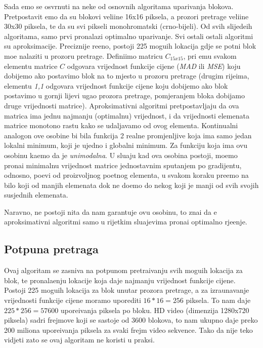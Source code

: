 Sada \cj emo se osvrnuti na neke od osnovnih algoritama uparivanja blokova. Pretpostavit \cj emo da su blokovi veli\ch ine 16x16 piksela, a prozori pretrage veli\ch ine 30x30 piksela, te da su svi pikseli monohromatski
(crno-bijeli). Od svih slijede\cj ih algoritama, samo prvi pronalazi optimalno uparivanje. Svi ostali ostali algoritmi su aproksimacije. Preciznije re\ch eno, postoji 225 mogu\cj ih lokacija gdje se po\ch tni blok mo\zh e nalaziti
u prozoru pretrage. Defini\sh imo matricu $C_{15x15}$, pri \ch emu svakom elementu matrice $C$ odgovara vrijednost funkcije cijene (\textit{MAD} ili \textit{MSE}) koju dobijemo ako postavimo blok na to mjesto u prozoru pretrage
(drugim rije\ch ima, elementu \textit{1,1} odgovara vrijednost funkcije cijene koju dobijemo ako blok postavimo u gornji lijevi ugao prozora pretrage, pomjeranjem bloka dobijamo druge vrijednosti matrice).
Aproksimativni algoritmi pretpostavljaju da ova matrica ima jednu najmanju (optimalnu) vrijednost, i da vrijednosti elemenata matrice monotono rastu kako se udaljavamo od ovog elementa. Kontinualni analogon ove osobine
bi bila funkcija 2 realne promjenljive koja ima samo jedan lokalni minimum, koji je ujedno i globalni minimum. Za funkciju koja ima ovu osobinu ka\zh emo da je \textit{unimodalna}. U slu\ch aju kad ova osobina postoji,
mo\zh emo prona\cj i minimalnu vrijednost matrice jednostavnim spu\sh tanjem po gradijentu, odnosno, po\ch ev\sh i od proizvoljnog po\ch etnog elementa, u svakom koraku pre\dj emo na bilo koji od manjih elemenata dok ne
do\dj emo do nekog koji je manji od svih svojih susjednih elemenata.

Naravno, ne postoji ni\sh ta da nam garantuje ovu osobinu, \sh to zna\ch i da \cj e aproksimativni algoritmi samo u rijetkim slu\ch ajevima prona\cj i optimalno rje\sh enje.

\subsection{Potpuna pretraga}
Ovaj algoritam se zasniva na potpunom pretra\zh ivanju svih mogu\cj ih lokacija za blok, te pronala\zh enju lokacije koja daje najmanju vrijednost funkcije cijene. Postoji 225 mogu\cj ih lokacija za blok unutar prozora pretrage,
a za izra\ch unavanje vrijednosti funkcije cijene moramo uporediti $16 * 16 = 256$ piksela. To nam daje $225 * 256 = 57600$ upore\dj ivanja piksela po bloku. HD video (dimenzija 1280x720 piksela) sadr\zh i frejmove koji se
sastoje od 3600 blokova, \sh to nam ukupno daje preko 200 miliona upore\dj ivanja piksela za svaki frejm video sekvence. Tako da nije te\sh ko vidjeti za\sh to se ovaj algoritam ne koristi u praksi.


